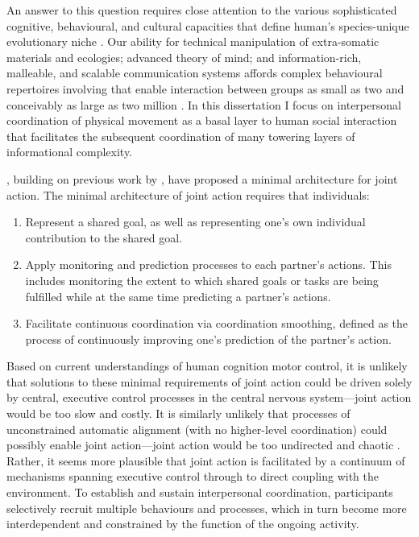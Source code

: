 \begin{CJK}{UTF8}{gbsn}
An answer to this question requires close attention to the various sophisticated cognitive, behavioural, and cultural capacities that define human's species-unique evolutionary niche \citep{Roepstorff2010,Clark2015,Fuentes2016}. Our ability for technical manipulation of extra-somatic materials and ecologies; advanced theory of mind; and information-rich, malleable, and scalable communication systems affords complex behavioural repertoires involving that enable interaction between groups as small as two and conceivably as large as two million \citep{Nowak2017}.  In this dissertation I focus on interpersonal coordination of physical movement as a basal layer to human social interaction that facilitates the subsequent coordination of many towering layers of informational complexity.

\textcite{Vesper2010}, building on previous work by  \textcite{Sebanz2006}, have proposed a minimal architecture for joint action.  The minimal architecture of joint action requires that individuals:

\begin{enumerate}
  \item Represent a shared goal, as well as representing one’s own individual contribution to the shared goal.
  \item Apply monitoring and prediction processes to each partner’s actions. This includes monitoring the extent to which shared goals or tasks are being fulfilled while at the same time predicting a partner’s actions.
  \item Facilitate continuous coordination via coordination smoothing, defined as the process of continuously improving one’s prediction of the partner’s action.
\end{enumerate}

Based on current understandings of human cognition motor control, it is unlikely that solutions to these minimal requirements of joint action could be driven solely by central, executive control processes in the central nervous system---joint action would be too slow and costly.  It is similarly unlikely that processes of unconstrained automatic alignment (with no higher-level coordination) could possibly enable joint action---joint action would be too undirected and chaotic \citep{Fusaroli2014}.  Rather, it seems more plausible that joint action is facilitated by a continuum of mechanisms spanning executive control through to direct coupling with the environment.  To establish and sustain interpersonal coordination, participants selectively recruit multiple behaviours and processes, which in turn become more interdependent and constrained by the function of the ongoing activity.


\end{CJK}
